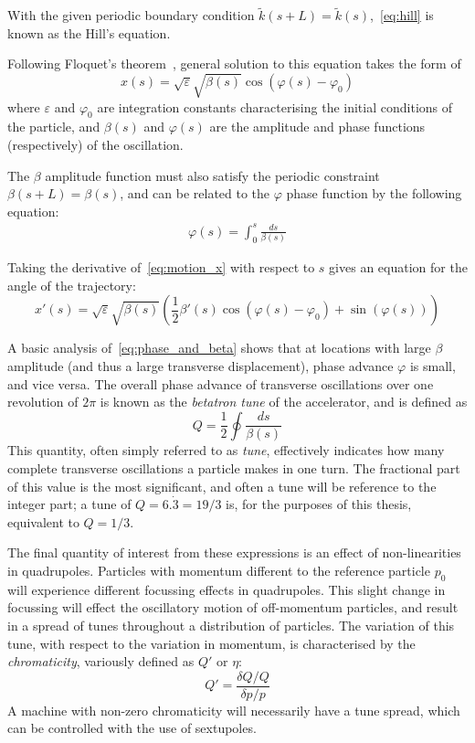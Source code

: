 \documentclass[11pt]{report}
\begin{document}
With the given periodic boundary condition $\tilde k(s+L)=\tilde{k}(s)$,~\ref{eq:hill} is known as the Hill's equation. 

Following Floquet's theorem~\cite{Rossbach:247501}, general solution to this equation takes the form of
\begin{equation}
x(s) =\sqrt{\varepsilon}\sqrt{\beta(s)}\cos(\varphi(s)-\varphi_0)
\label{eq:motion_x}
\end{equation} where $\varepsilon$ and $\varphi_0$ are integration constants characterising the initial conditions of the particle, and $\beta(s)$ and $\varphi(s)$ are the amplitude and phase functions (respectively) of the oscillation.

The $\beta$ amplitude function must also satisfy the periodic constraint $\beta(s+L)=\beta(s)$, and can be related to the $\varphi$ phase function by the following equation:
\begin{eqnarray}
  \varphi(s) = \int^s_0\frac{ds}{\beta(s)}
  \label{eq:phase_and_beta}
\end{eqnarray}


Taking the derivative of~\eqref{eq:motion_x} with respect to $s$ gives an equation for the angle of the trajectory:
\begin{equation}
x'(s)=\sqrt{\varepsilon}\sqrt{\beta(s)}\left(\frac12\beta'(s)\cos(\varphi(s)-\varphi_0)+\sin(\varphi(s))\right)
\label{eq:motion_px}
\end{equation}

A basic analysis of~\eqref{eq:phase_and_beta} shows that at locations with large $\beta$ amplitude (and thus a large transverse displacement), phase advance $\varphi$ is small, and vice versa. The overall phase advance of transverse oscillations over one revolution of $2\pi$ is known as the \textit{betatron tune} of the accelerator, and is defined as
\begin{equation}
  Q=\frac12\oint\frac{ds}{\beta(s)}
  \label{eq:betatron_tune}
\end{equation}
This quantity, often simply referred to as \textit{tune}, effectively indicates how many complete transverse oscillations a particle makes in one turn. The fractional part of this value is the most significant, and often a tune will be reference to the integer part; a tune of $Q=6.\dot 3=19/3$ is, for the purposes of this thesis, equivalent to $Q=1/3$.

The final quantity of interest from these expressions is an effect of non-linearities in quadrupoles. Particles with momentum different to the reference particle $p_0$ will experience different focussing effects in quadrupoles. This slight change in focussing will effect the oscillatory motion of off-momentum particles, and result in a spread of tunes throughout a distribution of particles. The variation of this tune, with respect to the variation in momentum, is characterised by the \textit{chromaticity}, variously defined as $Q'$ or $\eta$:
\begin{equation}
  Q' = \frac{\delta Q/Q}{\delta p/p}
  \label{eq:chroma}
\end{equation}
A machine with non-zero chromaticity will necessarily have a tune spread, which can be controlled with the use of sextupoles.
\end{document}
